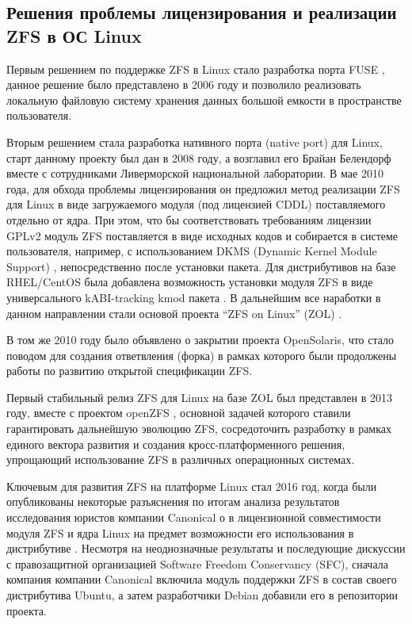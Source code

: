 \documentclass[10pt, a5paper]{article}
\begin{document}
\subsection*{Решения проблемы лицензирования и реализации ZFS в ОС Linux}

Первым решением по поддержке ZFS в Linux стало разработка порта FUSE \cite{bib2}, данное решение было представлено в 2006 году и позволило реализовать локальную файловую систему хранения данных большой емкости в пространстве пользователя.

Вторым решением стала разработка нативного порта (native \linebreak port) для Linux, старт данному проекту был дан в 2008 году, а  возглавил его Брайан Белендорф вместе с сотрудниками Ливерморской национальной лаборатории. В  мае 2010 года, для обхода проблемы лицензирования он предложил метод реализации  ZFS для Linux в виде загружаемого модуля (под лицензией CDDL) поставляемого отдельно от ядра. При этом, что бы соответствовать требованиям лицензии GPLv2 модуль ZFS поставляется в виде исходных кодов и собирается в системе пользователя, например, с использованием DKMS (Dynamic Kernel Module Support) \cite{bib3}, непосредственно после установки пакета. Для дистрибутивов на базе RHEL/CentOS была добавлена возможность установки модуля ZFS в виде универсального kABI-tracking kmod пакета \cite{bib4}. В дальнейшим все наработки в данном направлении стали основой проекта “ZFS on Linux” (ZOL) \cite{bib5}.

В том же 2010 году было объявлено о закрытии проекта \linebreak OpenSolaris, что стало поводом для создания ответвления (форка) в рамках которого были продолжены работы по развитию открытой спецификации ZFS.

Первый стабильный релиз ZFS для Linux на базе ZOL был представлен в 2013 году, вместе с проектом openZFS \cite{bib6}, основной задачей которого ставили гарантировать дальнейшую эволюцию ZFS, сосредоточить разработку в рамках единого вектора развития и создания  кросс-платформенного решения, упрощающий использование ZFS в различных операционных системах.

Ключевым для развития ZFS на платформе Linux стал 2016 год, когда были опубликованы некоторые разъяснения по итогам анализа результатов  исследования юристов компании Canonical о в лицензионной совместимости модуля ZFS и ядра Linux на предмет возможности его использования в дистрибутиве \cite{bib7}. Несмотря на неоднозначные результаты и последующие дискуссии с правозащитной организацией Software Freedom Conservancy (SFC), сначала компания  компании Canonical включила модуль поддержки ZFS в состав своего дистрибутива Ubuntu, а затем разработчики Debian добавили его в репозитории проекта.
\end{document}
